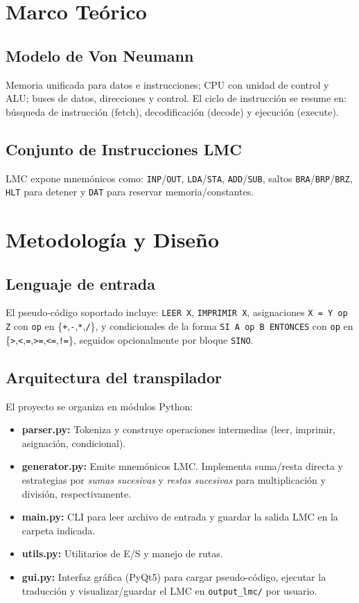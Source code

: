 \documentclass[12pt,a4paper]{article}
\begin{document}
\section{Marco Teórico}
\subsection{Modelo de Von Neumann}
Memoria unificada para datos e instrucciones; CPU con unidad de control y ALU; buses de datos, direcciones y control. El ciclo de instrucción se resume en: búsqueda de instrucción (fetch), decodificación (decode) y ejecución (execute).

\subsection{Conjunto de Instrucciones LMC}
LMC expone mnemónicos como: \texttt{INP}/\texttt{OUT}, \texttt{LDA}/\texttt{STA}, \texttt{ADD}/\texttt{SUB}, saltos \texttt{BRA}/\texttt{BRP}/\texttt{BRZ}, \texttt{HLT} para detener y \texttt{DAT} para reservar memoria/constantes.

\section{Metodología y Diseño}
\subsection{Lenguaje de entrada}
El pseudo-código soportado incluye: \texttt{LEER X}, \texttt{IMPRIMIR X}, asignaciones \texttt{X = Y op Z} con \texttt{op} en \{\texttt{+},\texttt{-},\texttt{*},\texttt{/}\}, y condicionales de la forma \texttt{SI A op B ENTONCES} con \texttt{op} en \{\texttt{>},\texttt{<},\texttt{=},\texttt{>=},\texttt{<=},\texttt{!=}\}, seguidos opcionalmente por bloque \texttt{SINO}.

\subsection{Arquitectura del transpilador}
El proyecto se organiza en módulos Python:
\begin{itemize}
  \item \textbf{parser.py:} Tokeniza y construye operaciones intermedias (leer, imprimir, asignación, condicional).
  \item \textbf{generator.py:} Emite mnemónicos LMC. Implementa suma/resta directa y estrategias por \emph{sumas sucesivas} y \emph{restas sucesivas} para multiplicación y división, respectivamente.
  \item \textbf{main.py:} CLI para leer archivo de entrada y guardar la salida LMC en la carpeta indicada.
  \item \textbf{utils.py:} Utilitarios de E/S y manejo de rutas.
  \item \textbf{gui.py:} Interfaz gráfica (PyQt5) para cargar pseudo-código, ejecutar la traducción y visualizar/guardar el LMC en \texttt{output\_lmc/} por usuario.
\end{itemize}
\end{document}
